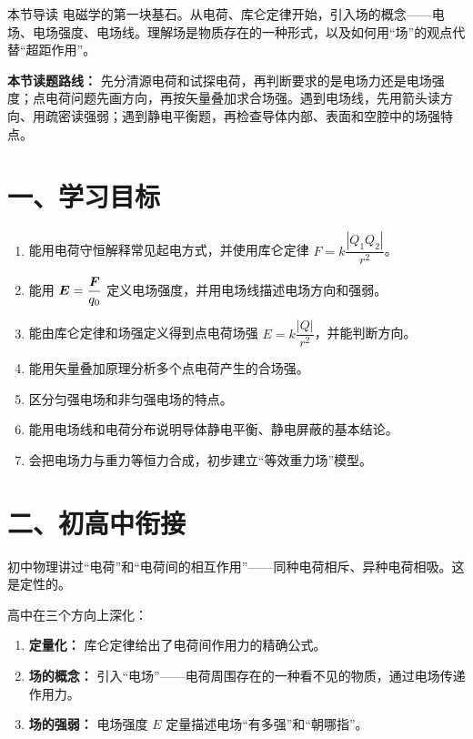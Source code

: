 
\begin{learningbox}{本节导读}
电磁学的第一块基石。从电荷、库仑定律开始，引入场的概念——电场、电场强度、电场线。理解场是物质存在的一种形式，以及如何用“场”的观点代替“超距作用”。
\end{learningbox}

\textbf{本节读题路线：} 先分清源电荷和试探电荷，再判断要求的是电场力还是电场强度；点电荷问题先画方向，再按矢量叠加求合场强。遇到电场线，先用箭头读方向、用疏密读强弱；遇到静电平衡题，再检查导体内部、表面和空腔中的场强特点。

\section*{一、学习目标}

\begin{enumerate}
  \item 能用电荷守恒解释常见起电方式，并使用库仑定律 $F = k\dfrac{|Q_1 Q_2|}{r^2}$。
  \item 能用 $\boldsymbol{E} = \dfrac{\boldsymbol{F}}{q_0}$ 定义电场强度，并用电场线描述电场方向和强弱。
  \item 能由库仑定律和场强定义得到点电荷场强 $E = k\dfrac{|Q|}{r^2}$，并能判断方向。
  \item 能用矢量叠加原理分析多个点电荷产生的合场强。
  \item 区分匀强电场和非匀强电场的特点。
  \item 能用电场线和电荷分布说明导体静电平衡、静电屏蔽的基本结论。
  \item 会把电场力与重力等恒力合成，初步建立“等效重力场”模型。
\end{enumerate}
\section*{二、初高中衔接}

初中物理讲过“电荷”和“电荷间的相互作用”——同种电荷相斥、异种电荷相吸。这是定性的。

高中在三个方向上深化：
\begin{enumerate}
  \item \textbf{定量化：} 库仑定律给出了电荷间作用力的精确公式。
  \item \textbf{场的概念：} 引入“电场”——电荷周围存在的一种看不见的物质，通过电场传递作用力。
  \item \textbf{场的强弱：} 电场强度 $E$ 定量描述电场“有多强”和“朝哪指”。
\end{enumerate}

